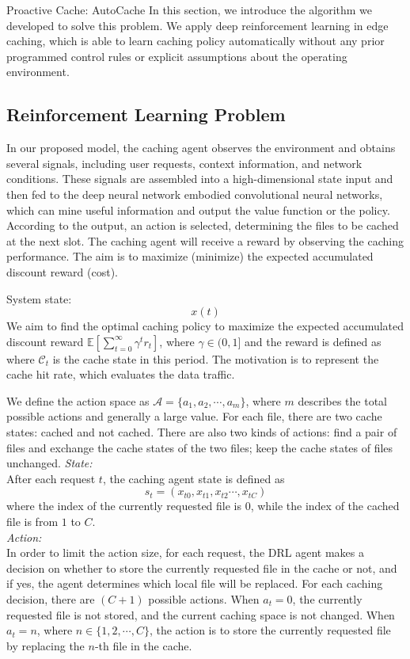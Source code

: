 \documentclass{article}
\begin{document}
\begin{section}{Proactive Cache: AutoCache}
    \label{algorithm}
    In this section, we introduce the algorithm we developed to solve this problem.
    We apply deep reinforcement learning in edge caching, which is able to learn caching policy automatically without any prior programmed control rules or explicit assumptions about the operating environment.

    \subsection{Reinforcement Learning Problem}
    In our proposed model, the caching agent observes the environment and obtains several signals, including user requests, context information, and network conditions. These signals are assembled into a high-dimensional state input and then fed to the deep neural network embodied convolutional neural networks, which can mine useful information and output the value function or the policy. According to the output, an action is selected, determining the files to be cached at the next slot. The caching agent will receive a reward by observing the caching performance. The aim is to maximize (minimize) the expected accumulated discount reward (cost).

    System state:
    $$
    x(t)
    $$
    We aim to find the optimal caching policy to maximize the expected accumulated discount reward $\mathbb{E}\left[\sum_{t=0}^{\infty}\gamma^tr_t\right]$, where $\gamma\in(0,1]$ and the reward is defined as where $\mathcal{C}_t$ is the cache state in this period. The motivation is to represent the cache hit rate, which evaluates the data traffic.

    We define the action space as $\mathcal{A}=\{a_1,a_2,\cdots,a_m\}$, where $m$ describes the total possible actions and generally a large value. For each file, there are two cache states: cached and not cached. There are also two kinds of actions: find a pair of files and exchange the cache states of the two files; keep the cache states of files unchanged.
    \emph{State:}\\
    After each request $t$, the caching agent state is defined as
    $$
        s_t=\left(x_{t0},x_{t1},x_{t2}\cdots,x_{tC}\right)
    $$
    where the index of the currently requested file is $0$, while the index of the cached file is from $1$ to $C$.\\
    \emph{Action:}\\
    In order to limit the action size, for each request, the DRL agent makes a decision on whether to store the currently requested file in the cache or not, and if yes, the agent determines which local file will be replaced. For each caching decision, there are $(C+1)$ possible actions. When $a_t=0$, the currently requested file is not stored, and the current caching space is not changed. When $a_t=n$, where $n\in\{1,2,\cdots,C\}$, the action is to store the currently requested file by replacing the $n$-th file in the cache.


\end{section}
\end{document}
